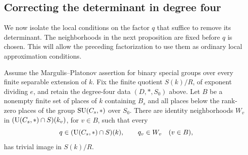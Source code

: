 \subsection{Correcting the determinant in degree four}
\label{ind:degree-four}

We now isolate the local conditions on the factor $q$ that suffice
to remove its determinant.  The neighborhoods in the next
proposition are fixed before $q$ is chosen.  This will allow the
preceding factorization to use them as ordinary local
approximation conditions.

\begin{proposition}\label{ind:degree-four-correction}
Assume the Margulis--Platonov assertion for binary special groups
over every finite separable extension of $k$.  Fix the finite
quotient $S(k)/R$, of exponent dividing $e$, and retain the
degree-four data $(D,*,S_0)$ above.  Let $B$ be a nonempty finite
set of places of $k$ containing $B_s$ and all places below the
rank-zero places of the group $\operatorname{SU}(C_s,*)$ over $S_0$.
There are identity neighborhoods $W_v$ in
$(\operatorname{U}(C_s,*)\cap S)(k_v)$, for $v\in B$, such that every
\[
 q\in(\operatorname{U}(C_s,*)\cap S)(k),\qquad q_v\in W_v\quad(v\in B),
\]
has trivial image in $S(k)/R$.
\end{proposition}

